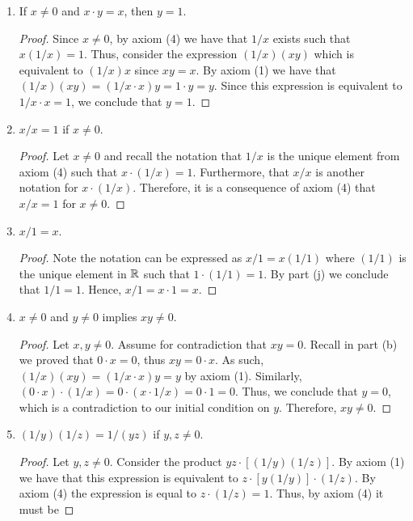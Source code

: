 \documentclass[12pt]{article}
\begin{document}
\begin{enumerate}[label=(\alph*)]
\begin{proof}
			Similarly, $-(x - y) = -1 \cdot (x + (-y))$, which analogously expands as $(-1)x + (-1)(-y)$.
			By part (f) $(-1)x = -x$ and $(-1)(-y) = -(-y)$. Furthermore, in part (d) we proved $-(-y) = y$.
			Thus, we conclude $-(x - y) = -x + y$. 
		\end{proof}
		\item If $x \neq 0$ and $x \cdot y = x$, then $y = 1$.
		\begin{proof}
			Since $x \neq 0$, by axiom (4) we have that $1/x$ exists such that $x(1/x) = 1$. 
			Thus, consider the expression $(1/x)(xy)$ which is equivalent to $(1/x)x$ since $xy = x$.
			By axiom (1) we have that $(1/x)(xy) = (1/x \cdot x)y = 1\cdot y = y$. Since this expression
			is equivalent to $1/x \cdot x = 1$, we conclude that $y = 1$.
		\end{proof}
		\item $x/x = 1$ if $x \neq 0$.
		\begin{proof}
			Let $x \neq 0$ and recall the notation that $1/x$ is the unique element from axiom (4) such
			that $x \cdot (1/x) = 1$. Furthermore, that $x/x$ is another notation for $x \cdot (1/x)$.
			Therefore, it is a consequence of axiom (4) that $x/x = 1$ for $x \neq 0$.
		\end{proof}
		\item $x/1 = x$.
		\begin{proof}
			Note the notation can be expressed as $x/1 = x(1/1)$ where $(1/1)$ is the unique element in
			$\mathbb{R}$ such that $1 \cdot (1/1) = 1$. By part (j) we conclude that $1/1 = 1$. Hence, 
			$x/1 = x \cdot 1 = x$.
		\end{proof}
		\item $x \neq 0$ and $y \neq 0$ implies $xy \neq 0$.
		\begin{proof}
			Let $x, y \neq 0$. Assume for contradiction that $xy = 0$. Recall in part (b) we proved
			that $0 \cdot x = 0$, thus $xy = 0 \cdot x$. As such, $(1/x)(xy) = (1/x \cdot x)y = y$
			by axiom (1). Similarly, $(0 \cdot x) \cdot (1/x) = 0 \cdot (x \cdot 1/x) = 0 \cdot 1 = 0$.
			Thus, we conclude that $y = 0$, which is a contradiction to our initial condition on $y$.
			Therefore, $xy \neq 0$.
		\end{proof}
		\item $(1/y)(1/z) = 1/(yz)$ if $y,z \neq 0$.
		\begin{proof}
			Let $y, z \neq 0$. Consider the product $yz \cdot [(1/y)(1/z)]$. By axiom (1) we have
			that this expression is equivalent to $z \cdot [y (1/y)] \cdot (1/z)$. By axiom (4)
			the expression is equal to $z \cdot (1/z) = 1$. Thus, by axiom (4) it must be 

\end{proof}
\end{enumerate}
\end{document}
